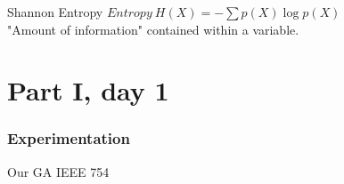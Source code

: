 \documentclass[10pt,aspectratio=169]{beamer}
\begin{document}
\begin{frame}{Shannon Entropy}
		$
		Entropy \ H(X) = -\sum p(X)\log p(X)
		$
		\\
		"Amount of information" contained within a variable.
\end{frame}

\part{Part I, day 1}

\section{Experimentation}

\begin{frame}{Our GA}
	IEEE 754
\end{frame}
\end{document}
